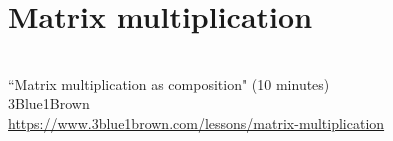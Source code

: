 \section{Matrix multiplication}
\begin{bookfigure}
   \\
  ``Matrix multiplication as composition" (10 minutes) \\
  \footnotesize 3Blue1Brown \\
  \url{https://www.3blue1brown.com/lessons/matrix-multiplication}
\end{bookfigure}
